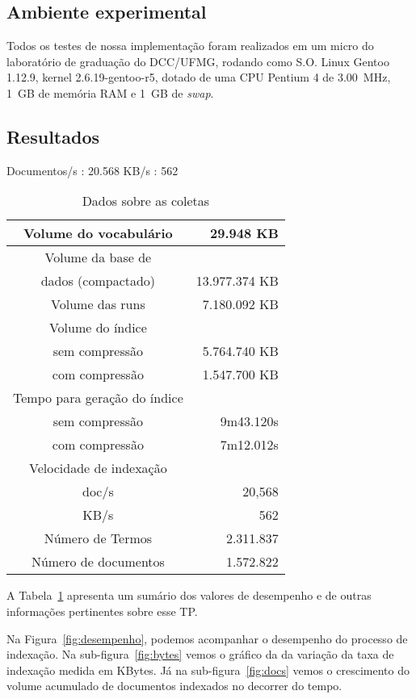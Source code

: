 \documentclass[10pt,twocolumn]{article}
\begin{document}
\subsection{Ambiente experimental}

Todos os testes de nossa implementação foram realizados em um micro do
laboratório de graduação do DCC/UFMG, rodando como S.O. Linux Gentoo
1.12.9, kernel 2.6.19-gentoo-r5, dotado de uma CPU Pentium 4 de
3.00~MHz, 1~GB de memória RAM e 1~GB de \emph{swap}.

\subsection{Resultados}

Documentos/s : 20.568
KB/s : 562


\begin{table}[htbp]
\centering
\begin{tabular}{|c|r|} \hline
Volume do vocabulário&	      29.948 KB \\\hline
Volume da base de &   			\\
dados (compactado)&   	  13.977.374 KB \\\hline
Volume das runs  &	   7.180.092 KB \\\hline
Volume do índice  &			\\
  sem compressão  &	   5.764.740 KB \\
  com compressão  &	   1.547.700 KB \\\hline
Tempo para geração do índice  &		\\
  sem compressão  &	   9m43.120s \\
  com compressão  &	   7m12.012s \\\hline
Velocidade de indexação&		\\
  doc/s		  & 20,568		\\
  KB/s		& 562			\\\hline
Número de Termos&     2.311.837	\\\hline
Número de documentos& 1.572.822		\\\hline
\hline
\end{tabular}
\caption{Dados sobre as coletas}
\label{tab:sumario}
\end{table}


A Tabela~\ref{tab:sumario} apresenta um sumário dos valores de
desempenho e de outras informações pertinentes sobre esse TP.

Na Figura~\ref{fig:desempenho}, podemos acompanhar o desempenho do
processo de indexação. Na sub-figura~\ref{fig:bytes} vemos o gráfico da
da variação da taxa de indexação medida em KBytes. Já na
sub-figura~\ref{fig:docs} vemos o crescimento do volume acumulado de
documentos indexados no decorrer do tempo.
\end{document}
